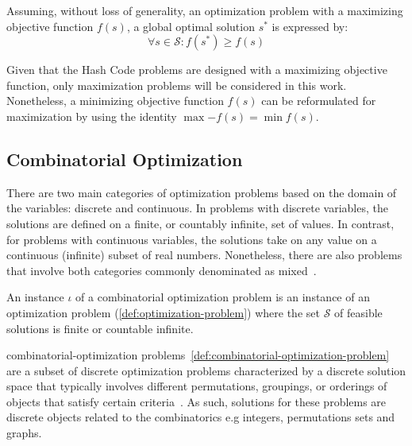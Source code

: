 \begin{definition}
    \label{definition:global-optimum}
    Assuming, without loss of generality, an optimization problem with a
    maximizing objective function $f(s)$, a global optimal solution $s^*$ is
    expressed by:
    \begin{equation}
        \forall s \in \mathcal{S} \colon f(s^{*}) \geq f(s)
    \end{equation}
\end{definition}

Given that the Hash Code problems are designed with a maximizing objective
function, only maximization problems will be considered in this work.
Nonetheless, a minimizing objective function $f(s)$ can be reformulated for
maximization by using the identity \textit{$\max{-f(s)} = \min{f(s)}$}.

\subsection{Combinatorial Optimization}
\label{section:combinatorial-optimization}

There are two main categories of optimization problems based on the domain
of the variables: discrete and continuous. In problems with discrete variables,
the solutions are defined on a finite, or countably infinite, set of values. In
contrast, for problems with continuous variables, the solutions take on any
value on a continuous (infinite) subset of real numbers. Nonetheless, there
are also problems that involve both categories commonly denominated as
mixed~\cite{nocedal2006numerical}.

\begin{definition}
    \label{def:combinatorial-optimization-problem}
    An instance $\iota$ of a combinatorial optimization problem is an instance of an
    optimization problem (\ref{def:optimization-problem}) where the set
    $\mathcal{S}$ of feasible solutions is finite or countable infinite.
\end{definition}

\acrfull{combinatorial-optimization} problems~\ref{def:combinatorial-optimization-problem}
are a subset of discrete optimization problems characterized by a discrete
solution space that typically involves different permutations, groupings, or orderings
of objects that satisfy certain criteria~\cite{vieira2009uma,papadimitriou1998combinatorial}.
As such, solutions for these problems are discrete objects related to the combinatorics e.g
integers, permutations sets and graphs.~\cite{blummetaheuristics,yu2010combinatorial}

